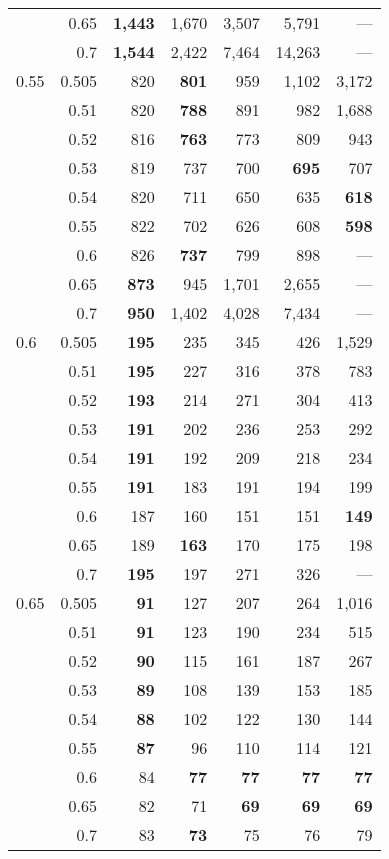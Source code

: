 \documentclass[12pt,runningheads]{llncs}
\begin{document}
{\begin{table}
\begin{tabular}{lr|rrrr|r}
     & 0.65 & \bf{1,443} & 1,670 & 3,507 & 5,791 & --- \\
     & 0.7 & \bf{1,544} & 2,422 & 7,464 & 14,263 & --- \\
\hline
0.55 & 0.505 & 820 & \bf{801} & 959 & 1,102 & 3,172 \\
     & 0.51 & 820 & \bf{788} & 891 & 982 & 1,688 \\
     & 0.52 & 816 & \bf{763} & 773 & 809 & 943 \\
     & 0.53 & 819 & 737 & 700 & \bf{695} & 707 \\
     & 0.54 & 820 & 711 & 650 & 635 & \bf{618} \\
     & 0.55 & 822 & 702 & 626 & 608 & \bf{598} \\
     & 0.6 & 826 & \bf{737} & 799 & 898 & --- \\
     & 0.65 & \bf{873} & 945 & 1,701 & 2,655 & --- \\
     & 0.7 & \bf{950} & 1,402 & 4,028 & 7,434 & --- \\
\hline
0.6 & 0.505 & \bf{195} & 235 & 345 & 426 & 1,529 \\
    & 0.51 & \bf{195} & 227 & 316 & 378 & 783 \\
    & 0.52 & \bf{193} & 214 & 271 & 304 & 413 \\
    & 0.53 & \bf{191} & 202 & 236 & 253 & 292 \\
    & 0.54 & \bf{191} & 192 & 209 & 218 & 234 \\
    & 0.55 & \bf{191} & 183 & 191 & 194 & 199 \\
    & 0.6 & 187 & 160 & 151 & 151 & \bf{149} \\
    & 0.65 & 189 & \bf{163} & 170 & 175 & 198 \\
    & 0.7 & \bf{195} & 197 & 271 & 326 & --- \\
\hline
0.65 & 0.505 & \bf{9}1 & 127 & 207 & 264 & 1,016 \\
     & 0.51 & \bf{91} & 123 & 190 & 234 & 515 \\
     & 0.52 & \bf{90} & 115 & 161 & 187 & 267 \\
     & 0.53 & \bf{89} & 108 & 139 & 153 & 185 \\
     & 0.54 & \bf{88} & 102 & 122 & 130 & 144 \\
     & 0.55 & \bf{87} & 96 & 110 & 114 & 121 \\
     & 0.6 & 84 & \bf{77} & \bf{77} & \bf{77} & \bf{77} \\
     & 0.65 & 82 & 71 & \bf{69} & \bf{69} & \bf{69} \\
     & 0.7 & 83 & \bf{73} & 75 & 76 & 79 \\

\end{tabular}
\end{table}}
\end{document}
